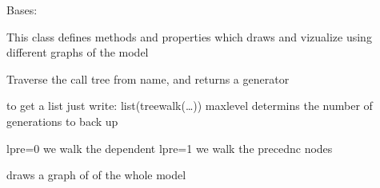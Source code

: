 \documentclass[letterpaper,10pt,english]{sphinxmanual}
\begin{document}
\begin{fulllineitems}
\label{\detokenize{core/modelclass:modelclass.Graph_Draw_Mixin}}
\pysigstartsignatures
{}
\pysigstopsignatures
\sphinxAtStartPar
Bases: 

\sphinxAtStartPar
This class defines methods and properties which draws and vizualize using different
graphs of the model

\begin{fulllineitems}
\label{\detokenize{core/modelclass:modelclass.Graph_Draw_Mixin.treewalk}}
\pysigstartsignatures
{}
\pysigstopsignatures
\sphinxAtStartPar
Traverse the call tree from name, and returns a generator

\sphinxAtStartPar
to get a list just write: list(treewalk(…))
maxlevel determins the number of generations to back up

\sphinxAtStartPar
lpre=0 we walk the dependent
lpre=1 we walk the precednc nodes

\end{fulllineitems}


\begin{fulllineitems}
\label{\detokenize{core/modelclass:modelclass.Graph_Draw_Mixin.drawendo}}
\pysigstartsignatures
{}
\pysigstopsignatures
\sphinxAtStartPar
draws a graph of of the whole model

\end{fulllineitems}



\end{fulllineitems}
\end{document}
